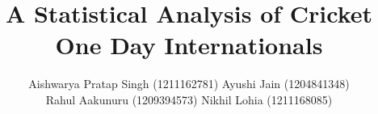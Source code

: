 \documentclass[10pt,journal,compsoc]{IEEEtran}
\begin{document}
%
\title{A Statistical Analysis of Cricket \\ One Day Internationals}
%
%
%
%

\author{Aishwarya Pratap Singh (1211162781) Ayushi Jain (1204841348)

Rahul Aakunuru (1209394573) Nikhil Lohia (1211168085)}

% 
%
\end{document}
